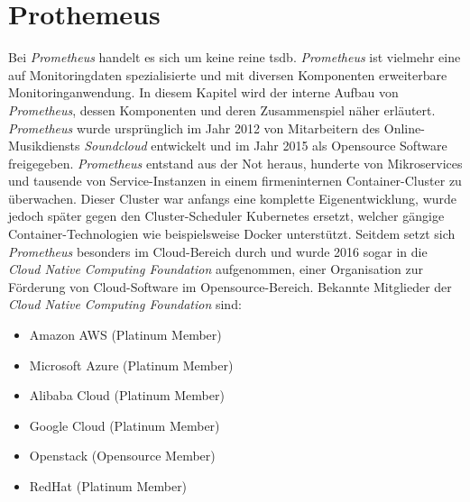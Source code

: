\documentclass[titlepage]{report}
\begin{document}
\section*{Prothemeus}
Bei \emph{Prometheus} handelt es sich um keine reine \gls{tsdb}.
\emph{Prometheus} ist vielmehr eine auf Monitoringdaten spezialisierte
und mit diversen Komponenten erweiterbare Monitoringanwendung. In diesem
Kapitel wird der interne Aufbau von \emph{Prometheus}, dessen
Komponenten und deren Zusammenspiel näher erläutert. \emph{Prometheus}
wurde ursprünglich im Jahr 2012 von Mitarbeitern des Online-Musikdiensts
\emph{Soundcloud} entwickelt\cite{PROMETHEUS_OVERVIEW} und im Jahr 2015
als Opensource Software freigegeben. \emph{Prometheus} entstand aus der
Not heraus, hunderte von Mikroservices und tausende von Service\hyp{}Instanzen
in einem firmeninternen Container\hyp{}Cluster zu
überwachen\cite{PROMETHEUS_YOUTUBE}. Dieser Cluster war anfangs eine
komplette Eigenentwicklung\cite{PROMETHEUS_YOUTUBE}, wurde jedoch später gegen den
Cluster\hyp{}Scheduler Kubernetes ersetzt\cite{KUBERNETESSOUNDCLOUD}, welcher gängige
Container\hyp{}Technologien wie beispielsweise Docker
unterstützt\cite{KUBERNETES}. Seitdem setzt sich
\emph{Prometheus} besonders im Cloud\hyp{}Bereich durch und wurde 2016
sogar in die \emph{Cloud Native Computing Foundation}
aufgenommen\cite{CNCF}, einer Organisation zur Förderung von
Cloud\hyp{}Software im Opensource\hyp{}Bereich. Bekannte Mitglieder der
\emph{Cloud Native Computing Foundation} sind\cite{CNCFLANDSCAPE}:
\begin{itemize}
    \item Amazon AWS (Platinum Member)
    \item Microsoft Azure (Platinum Member)
    \item Alibaba Cloud (Platinum Member)
    \item Google Cloud (Platinum Member)
    \item Openstack (Opensource Member)
    \item RedHat (Platinum Member)
\end{itemize}
\end{document}
